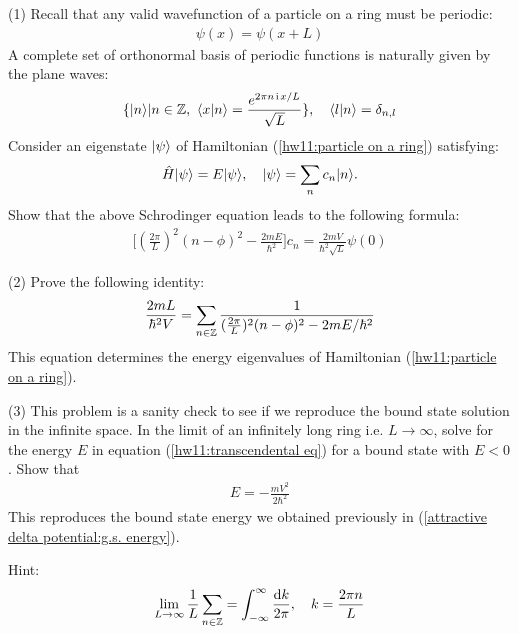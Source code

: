 (1) Recall that any valid wavefunction of a particle on a ring must be periodic:
\begin{align}
\psi(x)=\psi(x+L)
\end{align}
A complete set of orthonormal basis of periodic functions is naturally given by the plane waves:
\begin{align}
\{|{n}\rangle|n\in{\mathbb{Z}},~\langle{x|n}\rangle=\frac{e^{2\pi n\hspace{1pt}\mathrm{i}\hspace{1pt} x/L}}{\sqrt L}\},~~~\langle{l|n}\rangle=\delta_{n,l}
\end{align}
Consider an eigenstate $|{\psi}\rangle$ of Hamiltonian (\ref{hw11:particle on a ring}) satisfying:
\begin{align}
\hat H|{\psi}\rangle=E|{\psi}\rangle,~~~|{\psi}\rangle=\sum_nc_n|{n}\rangle.
\end{align}
Show that the above Schrodinger equation leads to the following formula:
\begin{align}\label{hw11:wf}
\big[(\frac{2\pi}{L})^2(n-\phi)^2-\frac{2mE}{\hbar^2}\big]c_n=\frac{2mV}{\hbar^2\sqrt{L}}\psi(0)
\end{align}


(2) Prove the following identity:
\begin{align}\label{hw11:transcendental eq}
\frac{2mL}{\hbar^2V}=\sum_{n\in{\mathbb{Z}}}\frac1{(\frac{2\pi}L)^2(n-\phi)^2-2mE/\hbar^2}
\end{align}
This equation determines the energy eigenvalues of Hamiltonian (\ref{hw11:particle on a ring}).

(3) This problem is a sanity check to see if we reproduce the bound state solution in the infinite space. In the limit of an infinitely long ring i.e. $L\rightarrow\infty$, solve for the energy $E$ in equation (\ref{hw11:transcendental eq}) for a bound state with $E<0$. Show that 
\begin{align}
E=-\frac{mV^2}{2\hbar^2}
\end{align}
This reproduces the bound state energy we obtained previously in (\ref{attractive delta potential:g.s. energy}). 
 
Hint:
 \begin{align}
\lim_{L\rightarrow\infty}\frac1{L}\sum_{n\in{\mathbb{Z}}}=\int_{-\infty}^\infty\frac{\text{d}k}{2\pi},~~~k=\frac{2\pi n}{L}
 \end{align}

